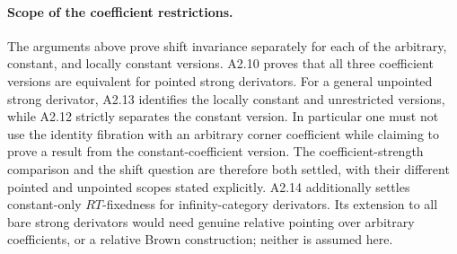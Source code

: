 \paragraph{Scope of the coefficient restrictions.}
The arguments above prove shift invariance separately for each of the
arbitrary, constant, and locally constant versions. A2.10 proves that all
three coefficient versions are equivalent for pointed strong derivators.
For a general unpointed strong derivator, A2.13 identifies the locally constant
and unrestricted versions, while A2.12 strictly separates the constant version.
In particular one must not use the identity
fibration with an arbitrary corner coefficient while claiming to prove a
result from the constant-coefficient version. The coefficient-strength
comparison and the shift question are therefore both settled, with their
different pointed and unpointed scopes stated explicitly. A2.14 additionally
settles constant-only $RT$-fixedness for infinity-category derivators. Its
extension to all bare strong derivators would need genuine relative
pointing over arbitrary coefficients, or a relative Brown construction;
neither is assumed here.
